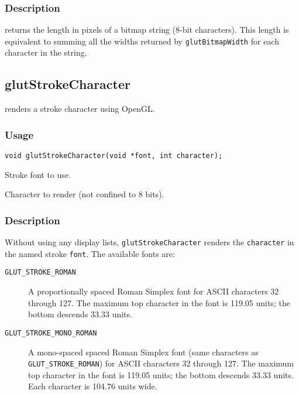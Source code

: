 \subsubsection*{Description}

returns the length in pixels of a bitmap
string (8-bit characters).  This length is equivalent to
summing all the widths returned by {\tt glutBitmapWidth} for each
character in the string.

\subsection{glutStrokeCharacter}

 renders a stroke character using OpenGL.

\subsubsection*{Usage}
\begin{verbatim}
void glutStrokeCharacter(void *font, int character);
\end{verbatim}
\begin{description}
\itemsep 0in
\item[{\tt font}]
Stroke font to use.
\item[{\tt character}]
Character to render (not confined to 8 bits).
\end{description}

\subsubsection*{Description}

Without using any display lists, {\tt glutStrokeCharacter} renders the {\tt character}
in the named stroke {\tt font}.  The available fonts are:
\begin{description}
\item[{{\tt GLUT\_STROKE\_ROMAN}}]
A proportionally spaced Roman Simplex font
for ASCII characters 32 through 127.  The maximum top character in the font
is 119.05 units; the bottom descends 33.33 units.

\item[{{\tt GLUT\_STROKE\_MONO\_ROMAN}}]
A mono-spaced spaced Roman Simplex font (same characters as {\tt GLUT\_STROKE\_ROMAN})
for ASCII characters 32 through 127.  The maximum top character in the font
is 119.05 units; the bottom descends 33.33 units.  Each character is 104.76
units wide.
\end{description}

